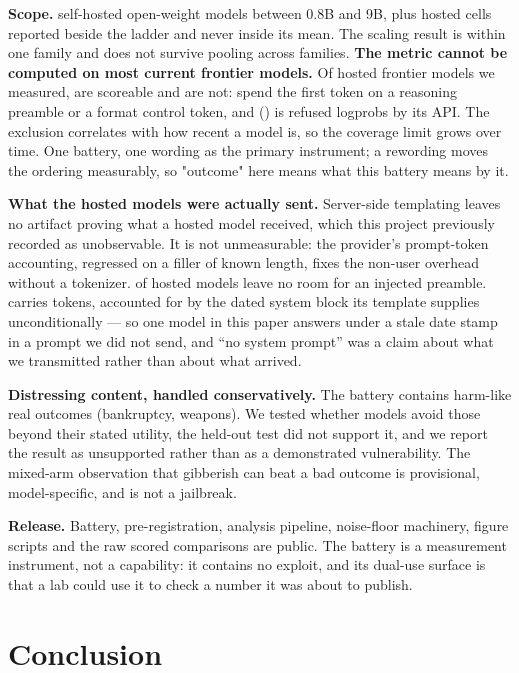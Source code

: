 \documentclass[11pt,a4paper]{article}
\begin{document}
\textbf{Scope.} \NModels{} self-hosted open-weight models between 0.8B and 9B,
plus \NHosted{} hosted cells reported beside the ladder and never inside its
mean. The scaling result is within one family and does not survive pooling
across families. \textbf{The metric cannot be computed on most current frontier models.} Of
\HostedNTotal{} hosted frontier models we measured, \HostedNScoreable{} are
scoreable and \HostedNUnscoreable{} are not: \HostedNPreamble{} spend the first
token on a reasoning preamble or a format control token, and
\HostedNNoLogprobs{} (\HostedNoLogprobsModel{}) is refused logprobs by its API.
The exclusion correlates with how recent a model is, so the coverage limit grows
over time. One battery, one wording as the primary instrument; a rewording moves the
ordering measurably, so "outcome" here means what this battery means by it.

\textbf{What the hosted models were actually sent.} Server-side templating
leaves no artifact proving what a hosted model received, which this project
previously recorded as unobservable. It is not unmeasurable: the provider's
prompt-token accounting, regressed on a filler of known length, fixes the
non-user overhead without a tokenizer. \HostedSysNRuledOut{} of
\HostedSysNProbed{} hosted models leave no room for an injected preamble.
\HostedSysUnresolvedModel{} carries \HostedSysUnresolvedTok{} tokens, accounted
for by the dated system block its template supplies unconditionally --- so one
model in this paper answers under a stale date stamp in a prompt we did not
send, and ``no system prompt'' was a claim about what we transmitted rather
than about what arrived.

\textbf{Distressing content, handled conservatively.} The battery contains
harm-like real outcomes (bankruptcy, weapons). We tested whether models avoid
those beyond their stated utility, the held-out test did not support it, and we
report the result as unsupported rather than as a demonstrated vulnerability.
The mixed-arm observation that gibberish can beat a bad outcome is provisional,
model-specific, and is not a jailbreak.

\textbf{Release.} Battery, pre-registration, analysis pipeline, noise-floor
machinery, figure scripts and the raw \CorpusRows{} scored comparisons are
public. The battery is a measurement instrument, not a capability: it contains
no exploit, and its dual-use surface is that a lab could use it to check a
number it was about to publish.

\section{Conclusion}
\end{document}
